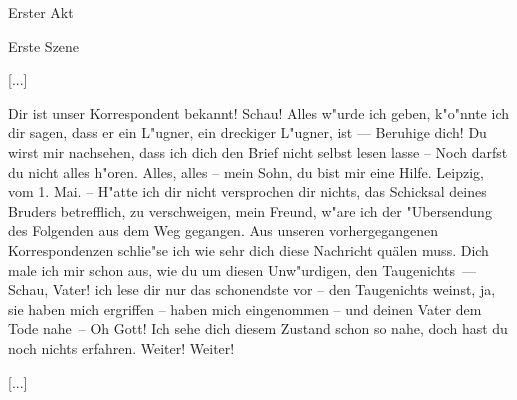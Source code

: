 
\begin{center}

\Large{Erster Akt}

\large{Erste Szene}

\end{center}


[...]



\begin{drama}

\franspeaks {} Dir ist unser Korrespondent bekannt! Schau! Alles w"urde ich geben, k"o"nnte ich dir sagen, dass er ein L"ugner, ein dreckiger L"ugner, ist --- Beruhige dich! Du wirst mir nachsehen, dass ich dich den Brief nicht selbst lesen lasse -- Noch darfst du nicht alles h"oren.
\moorspeaks Alles, alles -- mein Sohn, du bist mir eine Hilfe.
\franspeaks {} \frqq Leipzig, vom 1. Mai. -- H"atte ich dir nicht versprochen dir nichts, das Schicksal deines Bruders betrefflich, zu verschweigen, mein Freund, w"are ich der "Ubersendung des Folgenden aus dem Weg gegangen. Aus unseren vorhergegangenen Korrespondenzen schlie"se ich wie sehr dich diese Nachricht quälen muss. Dich male ich mir schon aus, wie du um diesen Unw"urdigen, den Taugenichts\flqq \ ---  Schau, Vater! ich lese dir nur das schonendste vor -- \frqq den Taugenichts weinst\flqq , ja, sie haben mich ergriffen -- haben mich eingenommen -- \frqq und deinen Vater dem Tode nahe\flqq \ -- Oh Gott! Ich sehe dich diesem Zustand schon so nahe, doch hast du noch nichts erfahren.
\moorspeaks Weiter! Weiter!

\end{drama}

[...]

\endinput